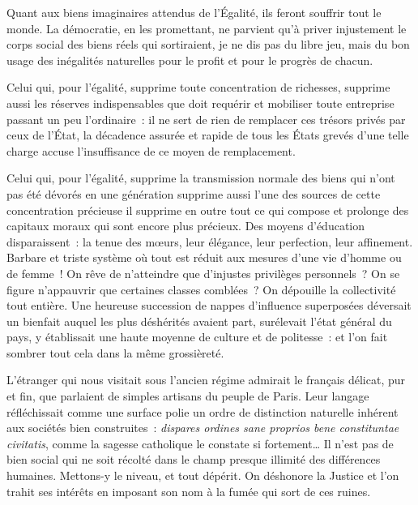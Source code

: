 \documentclass[french,twoside]{book} %
\begin{document}
Quant aux biens imaginaires attendus de l’Égalité, ils feront souffrir tout le monde. La démocratie, en les promettant, ne parvient qu’à priver injustement le corps social des biens réels qui sortiraient, je ne dis pas du libre jeu, mais du bon usage des inégalités naturelles pour le profit et pour le progrès de chacun.\par
Celui qui, pour l’égalité, supprime toute concentration de richesses, supprime aussi les réserves indispensables que doit requérir et mobiliser toute entreprise passant un peu l’ordinaire : il ne sert de rien de remplacer ces trésors privés par ceux de l’État, la décadence assurée et rapide de tous les États grevés d’une telle charge accuse l’insuffisance de ce moyen de remplacement.\par
Celui qui, pour l’égalité, supprime la transmission normale des biens qui n’ont pas été dévorés en une génération supprime aussi l’une des sources de cette concentration précieuse il supprime en outre tout ce qui compose et prolonge des capitaux moraux qui sont encore plus précieux. Des moyens d’éducation disparaissent : la tenue des mœurs, leur élégance, leur perfection, leur affinement. Barbare et triste système où tout est réduit aux mesures d’une vie d’homme ou de femme ! On rêve de n’atteindre que d’injustes privilèges personnels ? On se figure n’appauvrir que certaines classes comblées ? On dépouille la collectivité tout entière. Une heureuse succession de nappes d’influence superposées déversait un bienfait auquel les plus déshérités avaient part, surélevait l’état général du pays, y établissait une haute moyenne de culture et de politesse : et l’on fait sombrer tout cela dans la même grossièreté.\par
L’étranger qui nous visitait sous l’ancien régime admirait le français délicat, pur et fin, que parlaient de simples artisans du peuple de Paris. Leur langage réfléchissait comme une surface polie un ordre de distinction naturelle inhérent aux sociétés bien construites : \emph{dispares ordines sane proprios bene constituntae civitatis}, comme la sagesse catholique le constate si fortement… Il n’est pas de bien social qui ne soit récolté dans le champ presque illimité des différences humaines. Mettons-y le niveau, et tout dépérit. On déshonore la Justice et l’on trahit ses intérêts en imposant son nom à la fumée qui sort de ces ruines.\par
\end{document}
